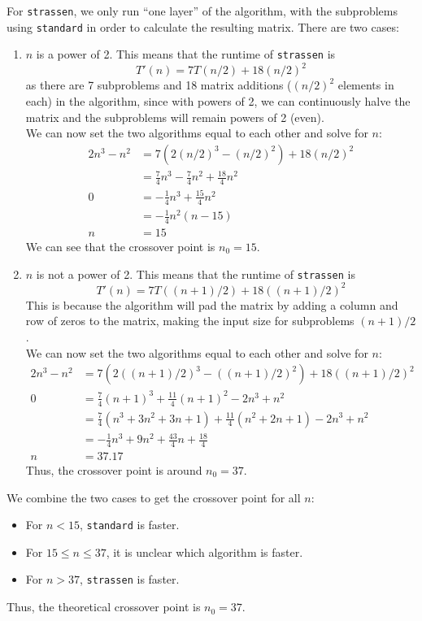 \documentclass[11pt]{scrartcl}
\theoremstyle{dotlessP}
\theoremstyle{dotlessN}
\theoremstyle{dotN}
\begin{document}
For \texttt{strassen}, we only run ``one layer'' of the algorithm, with the subproblems using \texttt{standard} in
order to calculate the resulting matrix. There are two cases:
\begin{enumerate}
    \item $n$ is a power of 2. This means that the runtime of \texttt{strassen} is
        \[
T'(n)=7T(n/2)+18(n/2)^2
        \] 
as there are 7 subproblems and 18 matrix additions ($(n/2)^2$ elements in each) in the algorithm, since with powers
of 2, we can continuously halve the matrix and the subproblems will remain powers of 2 (even).
\\

We can now set the two algorithms equal to each other and solve for $n$:
\begin{align*}
    2n^3 - n^2 &= 7(2(n/2)^3 - (n/2)^2) + 18(n/2)^2 \\
     &= \frac{7}{4}n^3 - \frac{7}{4}n^2 + \frac{18}{4}n^2 \\
    0 &= -\frac{1}{4}n^3 + \frac{15}{4}n^2 \\
     &= -\frac{1}{4}n^2(n - 15) \\
     n &= 15
\end{align*}
We can see that the crossover point is $n_0 = 15$.
\item $n$ is not a power of 2. This means that the runtime of \texttt{strassen} is 
\[
T'(n) = 7T((n+1)/2) + 18((n+1)/2)^2
\] 
    This is because the algorithm will pad the matrix by adding a column and row of zeros to the
    matrix, making the input size for subproblems $(n+1)/2$.
    \\

    We can now set the two algorithms equal to each other and solve for $n$:
    \begin{align*}
        2n^3 - n^2 &= 7(2((n+1)/2)^3 - ((n+1)/2)^2) + 18((n+1)/2)^2 \\
               0    &=\frac{7}{4}(n+1)^{3}+\frac{11}{4}(n+1)^{2}-2n^{3}+n^{2} \\
                    &= \frac{7}{4}\left(n^{3}+3n^{2}+3n+1\right)+\frac{11}{4}\left(n^{2}+2n+1\right)-2n^{3}+n^{2}\\
                    &= -\frac{1}{4}n^{3}+9n^{2}+\frac{43}{4}n+\frac{18}{4} \\
               n&= 37.17
           \end{align*}
           Thus, the crossover point is around $n_0 = 37$.
\end{enumerate}
We combine the two cases to get the crossover point for all $n$:
\begin{itemize}
    \item For $n < 15$, \texttt{standard} is faster. 
    \item For $15 \leq n \leq 37$, it is unclear which algorithm is faster.
        \item For $n > 37$, \texttt{strassen} is faster.
\end{itemize}
Thus, the theoretical crossover point is $n_0 = 37$.
\end{document}
